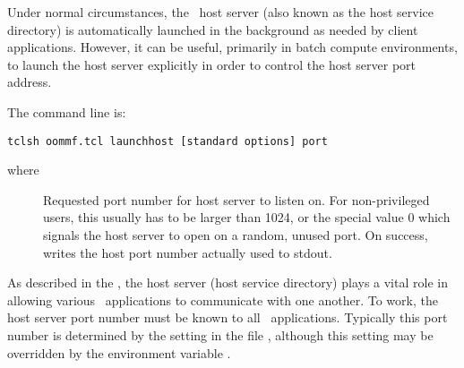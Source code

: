 Under normal circumstances, the \OOMMF\ host server (also known as the
host service directory) is automatically launched in the background as
needed by client applications.  However, it can be useful, primarily in
batch compute environments, to launch the host server explicitly in
order to control the host server port address.

The  command line is:
\begin{verbatim}
tclsh oommf.tcl launchhost [standard options] port
\end{verbatim}
where
\begin{description}
\item[]
Requested port number for host server to listen on.  For
non-privileged users, this usually has to be larger than 1024, or the
special value 0 which signals the host server to open on a random,
unused port.  On success,  writes the host port number
actually used to stdout.
\end{description}
As described in the , the host server (host service directory) plays a
vital role in allowing various \OOMMF\ applications to communicate
with one another.  To work, the host server port number must be known
to all \OOMMF\ applications.  Typically this port number is determined
by the  setting in the file
, although this
setting may be overridden by the environment variable
.

